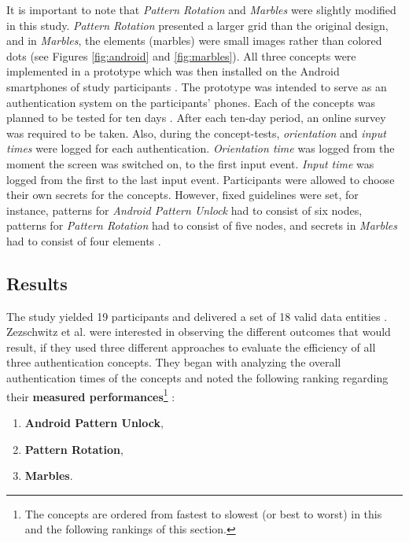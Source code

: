 It is important to note that \textit{Pattern Rotation} and \textit{Marbles} \cite{Marbles} were slightly modified in this study. \textit{Pattern Rotation} presented a larger grid than the original design, and in \textit{Marbles}, the elements (marbles) were small images rather than colored dots (see Figures \ref{fig:android} and \ref{fig:marbles}). All three concepts were implemented in a prototype which was then installed on the Android smartphones of study participants \cite{Zezschwitz}. The prototype was intended to serve as an authentication system on the participants' phones. Each of the concepts was planned to be tested for ten days \cite{Zezschwitz}. After each ten-day period, an online survey was required to be taken. Also, during the concept-tests, \textit{orientation} and \textit{input times} were logged for each authentication. \textit{Orientation time} was logged from the moment the screen was switched on, to the first input event. \textit{Input time} was logged from the first to the last input event. Participants were allowed to choose their own secrets for the concepts. However, fixed guidelines were set, for instance, patterns for \textit{Android Pattern Unlock} had to consist of six nodes, patterns for \textit{Pattern Rotation} had to consist of five nodes, and secrets in \textit{Marbles} had to consist of four elements \cite{Zezschwitz}.

\subsection{Results}

The study yielded 19 participants and delivered a set of 18 valid data entities \cite{Zezschwitz}. Zezschwitz et al. \cite{Zezschwitz} were interested in observing the different outcomes that would result, if they used three different approaches to evaluate the efficiency of all three authentication concepts. They began with analyzing the overall authentication times of the concepts and noted the following ranking regarding their \textbf{measured performances}\footnote{The concepts are ordered from fastest to slowest (or best to worst) in this and the following rankings of this section.} \cite{Zezschwitz}:

\begin{enumerate}
    \item \textbf{Android Pattern Unlock},
    \item \textbf{Pattern Rotation},
    \item \textbf{Marbles}.
\end{enumerate} 

